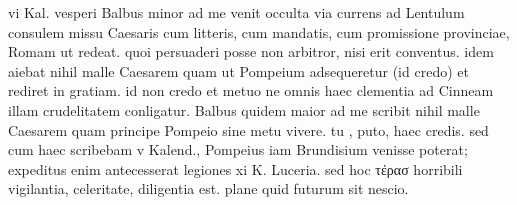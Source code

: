  vi Kal. vesperi Balbus minor ad me venit occulta via currens ad Lentulum consulem missu Caesaris cum litteris, cum mandatis, cum promissione provinciae, Romam ut redeat. quoi persuaderi posse non arbitror, nisi erit conventus. idem aiebat nihil malle Caesarem quam ut Pompeium adsequeretur (id credo) et rediret in gratiam. id non credo et metuo ne omnis haec clementia ad Cinneam illam crudelitatem conligatur. Balbus quidem maior ad me scribit nihil malle Caesarem quam principe Pompeio sine metu vivere. tu , puto, haec credis. sed cum haec scribebam v Kalend., Pompeius iam Brundisium venisse poterat; expeditus enim antecesserat legiones xi K. Luceria. sed hoc τέρασ horribili vigilantia, celeritate, diligentia est. plane quid futurum sit nescio.
